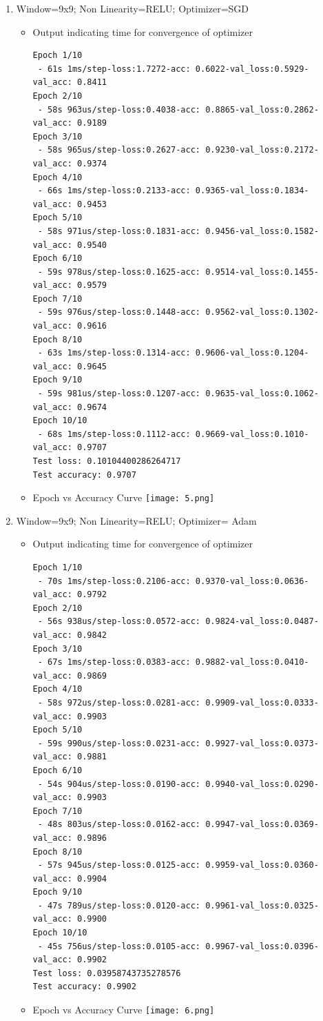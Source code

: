 \documentclass{article}
\begin{document}
\begin{enumerate}
\item Window=9x9; Non Linearity=RELU; Optimizer=SGD
\begin{itemize}
    \item Output indicating time for convergence of optimizer\newline
    \begin{verbatim}
Epoch 1/10
 - 61s 1ms/step-loss:1.7272-acc: 0.6022-val_loss:0.5929-val_acc: 0.8411
Epoch 2/10
 - 58s 963us/step-loss:0.4038-acc: 0.8865-val_loss:0.2862-val_acc: 0.9189
Epoch 3/10
 - 58s 965us/step-loss:0.2627-acc: 0.9230-val_loss:0.2172-val_acc: 0.9374
Epoch 4/10
 - 66s 1ms/step-loss:0.2133-acc: 0.9365-val_loss:0.1834-val_acc: 0.9453
Epoch 5/10
 - 58s 971us/step-loss:0.1831-acc: 0.9456-val_loss:0.1582-val_acc: 0.9540
Epoch 6/10
 - 59s 978us/step-loss:0.1625-acc: 0.9514-val_loss:0.1455-val_acc: 0.9579
Epoch 7/10
 - 59s 976us/step-loss:0.1448-acc: 0.9562-val_loss:0.1302-val_acc: 0.9616
Epoch 8/10
 - 63s 1ms/step-loss:0.1314-acc: 0.9606-val_loss:0.1204-val_acc: 0.9645
Epoch 9/10
 - 59s 981us/step-loss:0.1207-acc: 0.9635-val_loss:0.1062-val_acc: 0.9674
Epoch 10/10
 - 68s 1ms/step-loss:0.1112-acc: 0.9669-val_loss:0.1010-val_acc: 0.9707
Test loss: 0.10104400286264717
Test accuracy: 0.9707
\end{verbatim}
    \item Epoch vs Accuracy Curve\newline
    \texttt{[image: 5.png]}
\end{itemize}

\item Window=9x9; Non Linearity=RELU; Optimizer= Adam
\begin{itemize}
    \item Output indicating time for convergence of optimizer\newline
    \begin{verbatim}
Epoch 1/10
 - 70s 1ms/step-loss:0.2106-acc: 0.9370-val_loss:0.0636-val_acc: 0.9792
Epoch 2/10
 - 56s 938us/step-loss:0.0572-acc: 0.9824-val_loss:0.0487-val_acc: 0.9842
Epoch 3/10
 - 67s 1ms/step-loss:0.0383-acc: 0.9882-val_loss:0.0410-val_acc: 0.9869
Epoch 4/10
 - 58s 972us/step-loss:0.0281-acc: 0.9909-val_loss:0.0333-val_acc: 0.9903
Epoch 5/10
 - 59s 990us/step-loss:0.0231-acc: 0.9927-val_loss:0.0373-val_acc: 0.9881
Epoch 6/10
 - 54s 904us/step-loss:0.0190-acc: 0.9940-val_loss:0.0290-val_acc: 0.9903
Epoch 7/10
 - 48s 803us/step-loss:0.0162-acc: 0.9947-val_loss:0.0369-val_acc: 0.9896
Epoch 8/10
 - 57s 945us/step-loss:0.0125-acc: 0.9959-val_loss:0.0360-val_acc: 0.9904
Epoch 9/10
 - 47s 789us/step-loss:0.0120-acc: 0.9961-val_loss:0.0325-val_acc: 0.9900
Epoch 10/10
 - 45s 756us/step-loss:0.0105-acc: 0.9967-val_loss:0.0396-val_acc: 0.9902
Test loss: 0.03958743735278576
Test accuracy: 0.9902
\end{verbatim}
    \item Epoch vs Accuracy Curve\newline
    \texttt{[image: 6.png]}
\end{itemize}



\end{enumerate}
\end{document}
